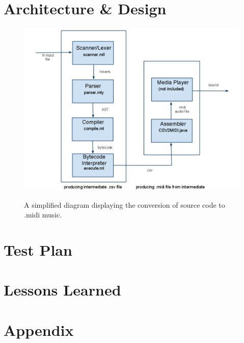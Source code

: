 \documentclass[12pt,A4]{book}
\begin{document}
\chapter{Architecture \& Design}
\begin{figure}
\center
\includegraphics[width=\textwidth]{blockdiagram.png}
\label{fig:block_diagram}
\caption{A simplified diagram displaying the conversion of source code to .midi music.}
\end{figure}
\chapter{Test Plan}
\chapter{Lessons Learned}
\chapter{Appendix}
\end{document}
